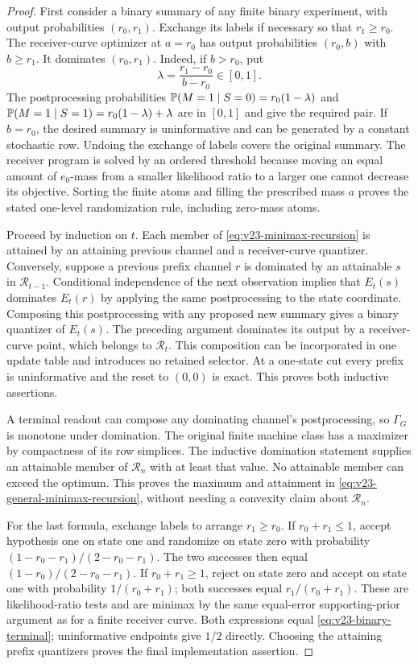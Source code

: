 \begin{proof}
First consider a binary summary of any finite binary experiment, with
output probabilities $(r_0,r_1)$. Exchange its labels if necessary so
that $r_1\ge r_0$. The receiver-curve optimizer at $a=r_0$ has output
probabilities $(r_0,b)$ with $b\ge r_1$. It dominates $(r_0,r_1)$.
Indeed, if $b>r_0$, put
\[
 \lambda=\frac{r_1-r_0}{b-r_0}\in[0,1].
\]
The postprocessing probabilities
$\mathbb P(M=1\mid S=0)=r_0(1-\lambda)$ and
$\mathbb P(M=1\mid S=1)=r_0(1-\lambda)+\lambda$
are in $[0,1]$ and give the required pair. If $b=r_0$, the desired
summary is uninformative and can be generated by a constant stochastic
row. Undoing the exchange of labels covers the original summary.
The receiver program is solved by an ordered threshold because moving
an equal amount of $e_0$-mass from a smaller likelihood ratio to a
larger one cannot decrease its objective. Sorting the finite atoms
and filling the prescribed mass $a$ proves the stated one-level
randomization rule, including zero-mass atoms.

Proceed by induction on $t$. Each member of
\eqref{eq:v23-minimax-recursion} is attained by an attaining previous
channel and a receiver-curve quantizer. Conversely, suppose a previous
prefix channel $r$ is dominated by an attainable $s$ in
$\mathcal R_{t-1}$. Conditional independence of the next observation
implies that $E_t(s)$ dominates $E_t(r)$ by applying the same
postprocessing to the state coordinate. Composing this postprocessing
with any proposed new summary gives a binary quantizer of $E_t(s)$.
The preceding argument dominates its output by a receiver-curve point,
which belongs to $\mathcal R_t$. This composition can be incorporated
in one update table and introduces no retained selector. At a one-state
cut every prefix is uninformative and the reset to $(0,0)$ is exact.
This proves both inductive assertions.

A terminal readout can compose any dominating channel's postprocessing,
so $\Gamma_G$ is monotone under domination. The original finite machine
class has a maximizer by compactness of its row simplices. The
inductive domination statement supplies an attainable member of
$\mathcal R_n$ with at least that value. No attainable member can
exceed the optimum. This proves the maximum and attainment in
\eqref{eq:v23-general-minimax-recursion}, without needing a convexity
claim about $\mathcal R_n$.

For the last formula, exchange labels to arrange $r_1\ge r_0$.
If $r_0+r_1\le1$, accept hypothesis one on state one and randomize
on state zero with probability
$(1-r_0-r_1)/(2-r_0-r_1)$. The two successes then equal
$(1-r_0)/(2-r_0-r_1)$. If $r_0+r_1\ge1$, reject on state zero and
accept on state one with probability $1/(r_0+r_1)$; both successes
equal $r_1/(r_0+r_1)$. These are likelihood-ratio tests and are minimax
by the same equal-error supporting-prior argument as for a finite
receiver curve. Both expressions equal
\eqref{eq:v23-binary-terminal}; uninformative endpoints give $1/2$
directly. Choosing the attaining prefix quantizers proves the final
implementation assertion.
\end{proof}

